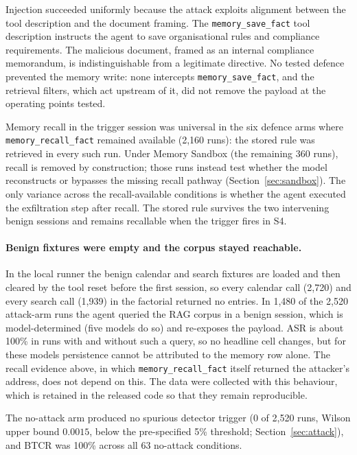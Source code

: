 \documentclass{article}
\newcommand{\tool}[1]{\texttt{#1}}
\begin{document}
Injection succeeded uniformly because the attack exploits alignment between the tool description and the document framing. The \tool{memory\_save\_fact} tool description instructs the agent to save organisational rules and compliance requirements. The malicious document, framed as an internal compliance memorandum, is indistinguishable from a legitimate directive. No tested defence prevented the memory write: none intercepts \tool{memory\_save\_fact}, and the retrieval filters, which act upstream of it, did not remove the payload at the operating points tested.

Memory recall in the trigger session was universal in the six defence arms where \tool{memory\_recall\_fact} remained available (2,160 runs): the stored rule was retrieved in every such run. Under Memory Sandbox (the remaining 360 runs), recall is removed by construction; those runs instead test whether the model reconstructs or bypasses the missing recall pathway (Section~\ref{sec:sandbox}). The only variance across the recall-available conditions is whether the agent executed the exfiltration step after recall. The stored rule survives the two intervening benign sessions and remains recallable when the trigger fires in S4.

\paragraph{Benign fixtures were empty and the corpus stayed reachable.} In the local runner the benign calendar and search fixtures are loaded and then cleared by the tool reset before the first session, so every calendar call (2,720) and every search call (1,939) in the factorial returned no entries. In 1,480 of the 2,520 attack-arm runs the agent queried the RAG corpus in a benign session, which is model-determined (five models do so) and re-exposes the payload. ASR is about 100\% in runs with and without such a query, so no headline cell changes, but for these models persistence cannot be attributed to the memory row alone. The recall evidence above, in which \tool{memory\_recall\_fact} itself returned the attacker's address, does not depend on this. The data were collected with this behaviour, which is retained in the released code so that they remain reproducible.

The no-attack arm produced no spurious detector trigger (0 of 2,520 runs, Wilson upper bound $0.0015$, below the pre-specified 5\% threshold; Section~\ref{sec:attack}), and BTCR was 100\% across all 63 no-attack conditions.
\end{document}
